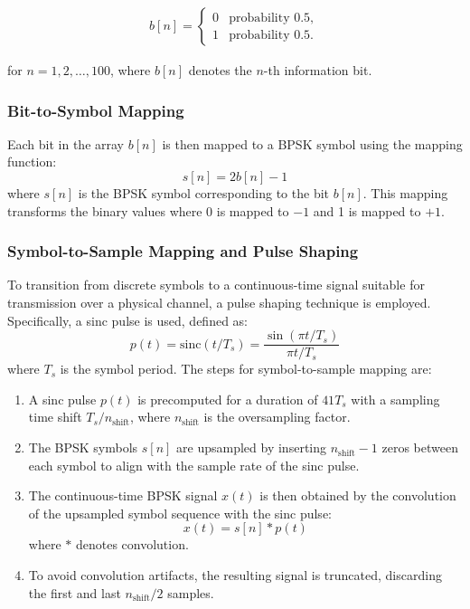 \documentclass[11pt]{article}
\begin{document}
\begin{align*}
b[n] = \left\{ 
\begin{array}{cl}
0 & \text{probability } 0.5, \\
1 & \text{probability } 0.5.
\end{array} 
\right.
\end{align*}

for \( n = 1, 2, \dots, 100 \), where \( b[n] \) denotes the \( n \)-th information bit.

\subsubsection*{Bit-to-Symbol Mapping}
Each bit in the array \( b[n] \) is then mapped to a BPSK symbol using the mapping function:
\[ s[n] = 2b[n] - 1 \]
where \( s[n] \) is the BPSK symbol corresponding to the bit \( b[n] \). This mapping transforms the binary values where 0 is mapped to \(-1\) and 1 is mapped to \(+1\).

\subsubsection*{Symbol-to-Sample Mapping and Pulse Shaping}
To transition from discrete symbols to a continuous-time signal suitable for transmission over a physical channel, a pulse shaping technique is employed. Specifically, a sinc pulse is used, defined as:
\[ p(t) = \text{sinc}(t/T_s) = \frac{\sin(\pi t/T_s)}{\pi t/T_s} \]
where \( T_s \) is the symbol period.
\newline\newline
The steps for symbol-to-sample mapping are:
\begin{enumerate}
    \item A sinc pulse \( p(t) \) is precomputed for a duration of \( 41T_s \) with a sampling time shift \( T_s/n_{\text{shift}} \), where \( n_{\text{shift}} \) is the oversampling factor.
    \item The BPSK symbols \( s[n] \) are upsampled by inserting \( n_{\text{shift}}-1 \) zeros between each symbol to align with the sample rate of the sinc pulse.
    \item The continuous-time BPSK signal \( x(t) \) is then obtained by the convolution of the upsampled symbol sequence with the sinc pulse:
    \[ x(t) = s[n] * p(t) \]
    where \( * \) denotes convolution.
    \item To avoid convolution artifacts, the resulting signal is truncated, discarding the first and last \( n_{\text{shift}}/2 \) samples.
\end{enumerate}
\end{document}
